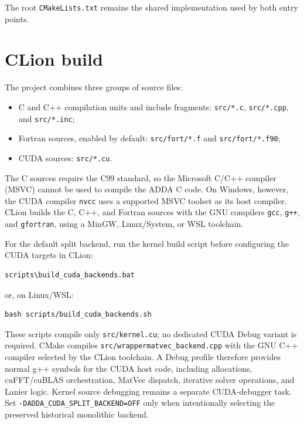 \documentclass[11pt,a4paper]{article}
\newcommand{\code}[1]{\nolinkurl{#1}}
\begin{document}
The root \code{CMakeLists.txt} remains the shared implementation used by both
entry points.

\section{CLion build}

The project combines three groups of source files:

\begin{itemize}
  \item C and C++ compilation units and include fragments: \code{src/*.c},
        \code{src/*.cpp}, and \code{src/*.inc};
  \item Fortran sources, enabled by default: \code{src/fort/*.f} and
        \code{src/fort/*.f90};
  \item CUDA sources: \code{src/*.cu}.
\end{itemize}

The C sources require the C99 standard, so the Microsoft C/C++ compiler (MSVC)
cannot be used to compile the ADDA C code. On Windows, however, the CUDA
compiler \code{nvcc} uses a supported MSVC toolset as its host compiler. CLion
builds the C, C++, and Fortran sources with the GNU compilers
\code{gcc}, \code{g++}, and \code{gfortran}, using a MinGW, Linux/System, or
WSL toolchain.

For the default split backend, run the kernel build script before configuring
the CUDA targets in CLion:

\begin{lstlisting}[language={}]
scripts\build_cuda_backends.bat
\end{lstlisting}

or, on Linux/WSL:

\begin{lstlisting}[language={}]
bash scripts/build_cuda_backends.sh
\end{lstlisting}

These scripts compile only \code{src/kernel.cu}; no dedicated CUDA Debug
variant is required. CMake compiles \code{src/wrappermatvec_backend.cpp} with
the GNU C++ compiler selected by the CLion toolchain. A Debug profile therefore
provides normal g++ symbols for the CUDA host code, including allocations,
cuFFT/cuBLAS orchestration, MatVec dispatch, iterative solver operations, and
Lanier logic. Kernel source debugging remains a separate CUDA-debugger task.
Set \code{-DADDA_CUDA_SPLIT_BACKEND=OFF} only when intentionally selecting the
preserved historical monolithic backend.
\end{document}
